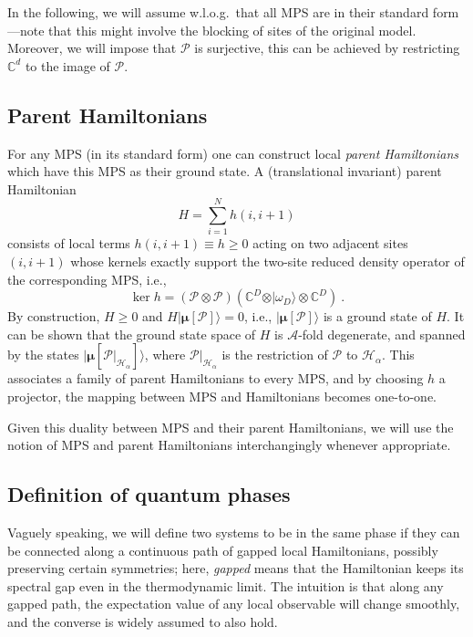\documentclass[twocolumn,superscriptaddress,prb,linenumbers]{revtex4-1}
\newcommand{\ket}[1]{\vert#1\rangle}
\newcommand{\MPS}[1]{| {\bm\mu}[#1]\rangle}
\newcommand{\mc}[1]{\mathcal{#1}}
\begin{document}
In the following, we will assume w.l.o.g.\ that all MPS are in their
standard form---note that this might involve the blocking of sites of the
original model. Moreover, we will impose that $\mc P$ is surjective, this
can be achieved by restricting $\mathbb C^d$ to the image of $\mc P$.

\subsection{Parent Hamiltonians}


For any MPS (in its standard form) one can construct local \emph{parent
    Hamiltonians} which have this MPS as their ground state.  A (translational
invariant) parent Hamiltonian
\[
    H=\sum_{i=1}^N h(i,i+1)
\]
consists of local terms
$h(i,i+1)\equiv h\ge0$ acting
on two adjacent sites $(i,i+1)$ whose kernels exactly support the two-site
reduced density operator of the corresponding MPS, i.e.,
\begin{equation}
    \label{eq:mps-def:parentham-def}
    \mathop{\mathrm{ker}} h =
    (\mc P\otimes \mc P) (\mathbb C^D\otimes \ket{\omega_D}\otimes
    \mathbb C^D)\ .
\end{equation}
By construction, $H\ge0$ and $H\MPS{\mc P}=0$, i.e.,
$\MPS{\mc P}$ is a ground state of $H$. It can be shown that the ground
state space of $H$ is $\mathcal A$-fold degenerate, and spanned by the
states $\MPS{\mc P\vert_{\mc H_\alpha}}$, where
$\mc P\vert_{\mc H_\alpha}$ is the restriction of $\mc P$ to $\mc
    H_\alpha$.%
\cite{fannes:FCS,nachtergaele:degen-mps,perez-garcia:mps-reps}
This associates a family of parent Hamiltonians to every MPS, and by
choosing $h$ a projector, the mapping between MPS and
Hamiltonians becomes one-to-one.

Given this duality between MPS and their parent Hamiltonians, we will use
the notion of MPS and parent Hamiltonians interchangingly whenever
appropriate.


\subsection{Definition of quantum phases}

Vaguely speaking, we will define two systems to be in the same phase if
they can be connected along a continuous path of gapped local
Hamiltonians, possibly preserving certain symmetries; here, \emph{gapped}
means that the Hamiltonian keeps its spectral gap even in the
thermodynamic limit.  The intuition is that along any gapped path, the
expectation value of any local observable will change smoothly, and the
converse is widely assumed to also hold.~\cite{chen:2d-rg}
\end{document}

